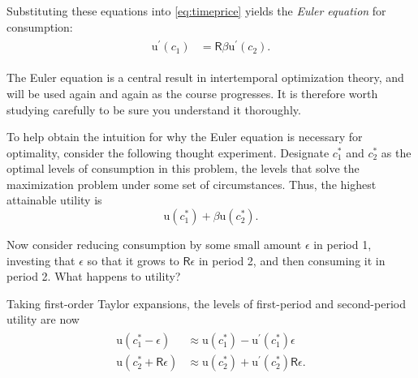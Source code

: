 \documentclass{scrartcl}
\begin{document}
  Substituting these equations into \eqref{eq:timeprice} yields the \textit{Euler equation} for consumption:
  \begin{equation}\begin{gathered}\begin{aligned} \mathrm{u}^{\prime}(\boldsymbol{\mathit{c}}_{1}) & = \mathsf{R} \beta \mathrm{u}^{\prime}(\boldsymbol{\mathit{c}}_{2}). \label{eq:euler}
      \end{aligned}\end{gathered}\end{equation}

  The Euler equation is a central result in intertemporal optimization theory, and will be used again and again as the course progresses.
  It is therefore worth studying carefully to be sure you understand it thoroughly.

  To help obtain the intuition for why the Euler equation is necessary for optimality, consider the following thought experiment.
  Designate $\boldsymbol{\mathit{c}}^{*}_{1}$ and $\boldsymbol{\mathit{c}}^{*}_{2}$ as the optimal levels of consumption in this problem, the levels that solve the maximization problem under some set of circumstances.
  Thus, the highest attainable utility is
  \begin{equation} \mathrm{u}(\boldsymbol{\mathit{c}}_{1}^{*})+\beta \mathrm{u}(\boldsymbol{\mathit{c}}_{2}^{*}) \label{eq:maxutil}.
  \end{equation}

  Now consider reducing consumption by some small amount $\epsilon$ in period 1, investing that $\epsilon$ so that it grows to $\mathsf{R} \epsilon$ in period 2, and then consuming it in period 2.
  What happens to utility?

  Taking first-order Taylor expansions, the levels of first-period and second-period utility are now
  \begin{equation}\begin{gathered}\begin{aligned} \mathrm{u}(\boldsymbol{\mathit{c}}_{1}^{*}-\epsilon) & \approx \mathrm{u}(\boldsymbol{\mathit{c}}_{1}^{*})-\mathrm{u}^{\prime}(\boldsymbol{\mathit{c}}_{1}^{*})\epsilon \\ \mathrm{u}(\boldsymbol{\mathit{c}}_{2}^{*}+\mathsf{R}\epsilon) & \approx \mathrm{u}(\boldsymbol{\mathit{c}}_{2}^{*})+\mathrm{u}^{\prime}(\boldsymbol{\mathit{c}}_{2}^{*})\mathsf{R}\epsilon.
      \end{aligned}\end{gathered}\end{equation}
\end{document}
